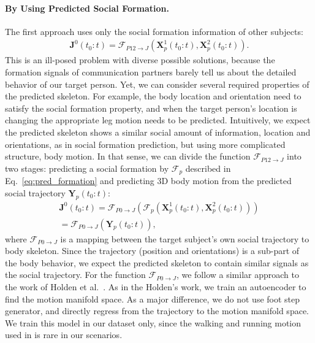 \paragraph{By Using Predicted Social Formation.} The first approach uses only the social formation information of other subjects:
\begin{gather}	
\mathbf{J}^0(t_0:t) = \mathcal{F}_{P12\rightarrow J} \left( \mathbf{X}_p^1(t_0:t), \mathbf{X}_p^2(t_0:t) \right).
\end{gather}
This is an ill-posed problem with diverse possible solutions, because the formation signals of communication partners barely tell us about the detailed behavior of our target person. Yet, we can consider several required properties of the predicted skeleton. For example, the body location and orientation need to satisfy the social formation property, and when the target person's location is changing the appropriate leg motion needs to be predicted. Intuitively, we expect the predicted skeleton shows a similar social amount of information, location and orientations, as in social formation prediction, but using more complicated structure, body motion. In that sense, we can divide the function $\mathcal{F}_{P12\rightarrow J}$ into two stages: predicting a social formation by $\mathcal{F}_p$ described in Eq.~\ref{eq:pred_formation} and predicting 3D body motion from the predicted social trajectory $\mathbf{Y}_p (t_0:t)$:
\begin{gather}	
\mathbf{J}^0 (t_0:t) = \mathcal{F}_{P0\rightarrow J} \left(   \mathcal{F}_p \left( \mathbf{X}_p^1(t_0:t), \mathbf{X}_p^2(t_0:t) \right) \right) \nonumber \\ 
= \mathcal{F}_{P0\rightarrow J} \left( \mathbf{Y}_p (t_0:t)  \right),
\label{eq:pred_p2J}
\end{gather}
where $\mathcal{F}_{P0\rightarrow J}$ is a mapping between the target subject's own social trajectory to body skeleton. Since the trajectory (position and orientations) is a sub-part of the body behavior, we expect the predicted skeleton to contain similar signals as the social trajectory. For the function $\mathcal{F}_{P0\rightarrow J}$, we follow a similar approach to the work of Holden et al.~\cite{holden2016deep}. As in the Holden's work, we train an autoencoder to find the motion manifold space. As a major difference, we do not use foot step generator, and directly regress from the trajectory to the motion manifold space. We train this model in our dataset only, since the walking and running motion used in \cite{holden2016deep} is rare in our scenarios. 

